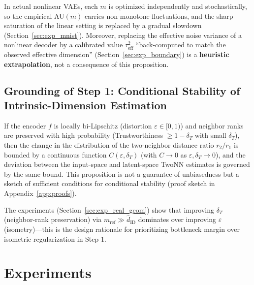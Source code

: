 \documentclass[make,article,submit,pdftex,moreauthors]{Definitions/mdpi}
\newcommand{\hatdID}{\hat{d}_{\mathrm{ID}}}
\begin{document}
\begin{Remark}
In actual nonlinear VAEs, each $m$ is optimized independently and
stochastically, so the empirical AU$(m)$ carries non-monotone fluctuations,
and the sharp saturation of the linear setting is replaced by a gradual
slowdown (Section~\ref{sec:exp_mnist}).
Moreover, replacing the effective noise variance of a nonlinear decoder by a
calibrated value $\tau^2_{\mathrm{eff}}$ ``back-computed to match the
observed effective dimension'' (Section~\ref{sec:exp_boundary}) is a
\textbf{heuristic extrapolation}, not a consequence of this proposition.
\end{Remark}

\subsection{Grounding of Step 1: Conditional Stability of Intrinsic-Dimension Estimation}\label{sec:theory_twonn}

\begin{Proposition}\label{thm:twonn_stability}
If the encoder $f$ is locally bi-Lipschitz (distortion
$\varepsilon \in [0,1)$) and neighbor ranks are preserved with high
probability (Trustworthiness $\geq 1 - \delta_T$ with small $\delta_T$),
then the change in the distribution of the two-neighbor distance ratio
$r_2/r_1$ is bounded by a continuous function $C(\varepsilon, \delta_T)$
(with $C \to 0$ as $\varepsilon, \delta_T \to 0$), and the deviation between
the input-space and latent-space TwoNN estimates is governed by the same
bound.
This proposition is not a guarantee of unbiasedness but a sketch of
sufficient conditions for conditional stability (proof sketch in
Appendix~\ref{app:proofs}).
\end{Proposition}

The experiments (Section~\ref{sec:exp_real_geom}) show that improving
$\delta_T$ (neighbor-rank preservation) via $m_{\mathrm{ref}} \gg \hatdID$
dominates over improving $\varepsilon$ (isometry)---this is the design
rationale for prioritizing bottleneck margin over isometric regularization
in Step 1.

\section{Experiments}\label{sec:exp}
\end{document}
